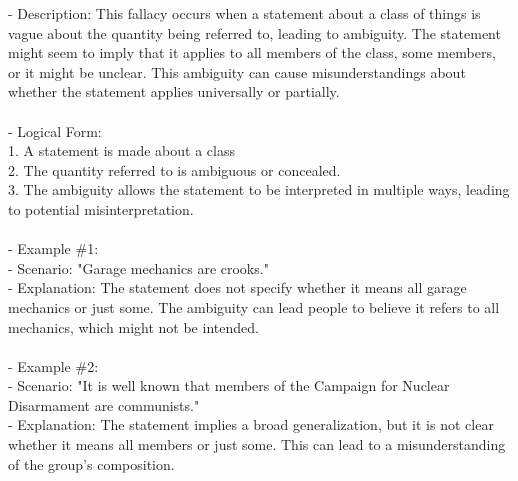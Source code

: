 \documentclass[a4paper,12pt,single,pdftex]{scrbook}
\begin{document}
      - Description: This fallacy occurs when a statement about a class of things is vague about the quantity being referred to, leading to ambiguity. The statement might seem to imply that it applies to all members of the class, some members, or it might be unclear. This ambiguity can cause misunderstandings about whether the statement applies universally or partially.
    \\

    
      
    \\

    
      - Logical Form: 
    \\

    
        1. A statement is made about a class
    \\

    
        2. The quantity referred to is ambiguous or concealed.
    \\

    
        3. The ambiguity allows the statement to be interpreted in multiple ways, leading to potential misinterpretation.
    \\

    
      
    \\

    
      - Example \#1:
    \\

    
        - Scenario: "Garage mechanics are crooks."
    \\

    
        - Explanation: The statement does not specify whether it means all garage mechanics or just some. The ambiguity can lead people to believe it refers to all mechanics, which might not be intended.
    \\

    
      
    \\

    
      - Example \#2:
    \\

    
        - Scenario: "It is well known that members of the Campaign for Nuclear Disarmament are communists."
    \\

    
        - Explanation: The statement implies a broad generalization, but it is not clear whether it means all members or just some. This can lead to a misunderstanding of the group's composition.
    \\
\end{document}
